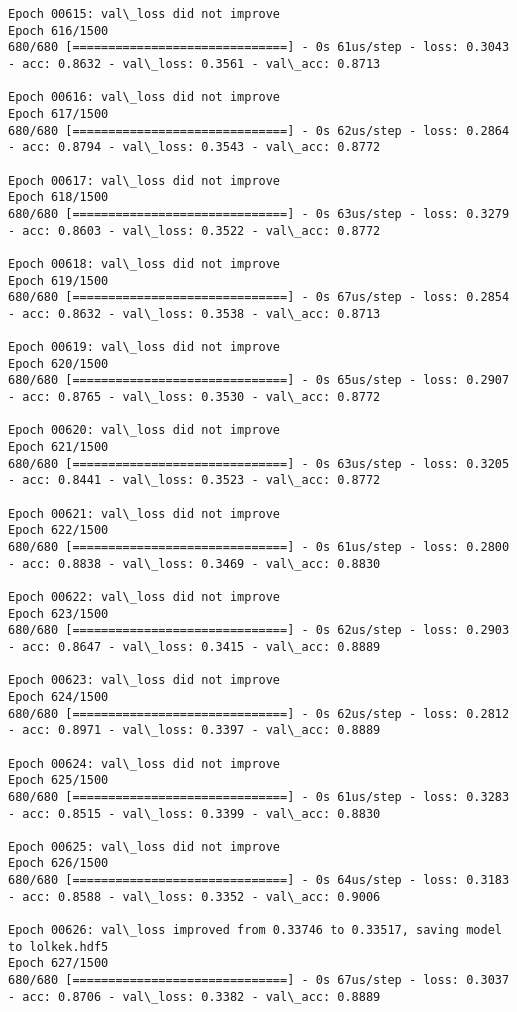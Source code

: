\documentclass[11pt]{article}
\begin{document}
\begin{Verbatim}[commandchars=\\\{\}]
Epoch 00615: val\_loss did not improve
Epoch 616/1500
680/680 [==============================] - 0s 61us/step - loss: 0.3043 - acc: 0.8632 - val\_loss: 0.3561 - val\_acc: 0.8713

Epoch 00616: val\_loss did not improve
Epoch 617/1500
680/680 [==============================] - 0s 62us/step - loss: 0.2864 - acc: 0.8794 - val\_loss: 0.3543 - val\_acc: 0.8772

Epoch 00617: val\_loss did not improve
Epoch 618/1500
680/680 [==============================] - 0s 63us/step - loss: 0.3279 - acc: 0.8603 - val\_loss: 0.3522 - val\_acc: 0.8772

Epoch 00618: val\_loss did not improve
Epoch 619/1500
680/680 [==============================] - 0s 67us/step - loss: 0.2854 - acc: 0.8632 - val\_loss: 0.3538 - val\_acc: 0.8713

Epoch 00619: val\_loss did not improve
Epoch 620/1500
680/680 [==============================] - 0s 65us/step - loss: 0.2907 - acc: 0.8765 - val\_loss: 0.3530 - val\_acc: 0.8772

Epoch 00620: val\_loss did not improve
Epoch 621/1500
680/680 [==============================] - 0s 63us/step - loss: 0.3205 - acc: 0.8441 - val\_loss: 0.3523 - val\_acc: 0.8772

Epoch 00621: val\_loss did not improve
Epoch 622/1500
680/680 [==============================] - 0s 61us/step - loss: 0.2800 - acc: 0.8838 - val\_loss: 0.3469 - val\_acc: 0.8830

Epoch 00622: val\_loss did not improve
Epoch 623/1500
680/680 [==============================] - 0s 62us/step - loss: 0.2903 - acc: 0.8647 - val\_loss: 0.3415 - val\_acc: 0.8889

Epoch 00623: val\_loss did not improve
Epoch 624/1500
680/680 [==============================] - 0s 62us/step - loss: 0.2812 - acc: 0.8971 - val\_loss: 0.3397 - val\_acc: 0.8889

Epoch 00624: val\_loss did not improve
Epoch 625/1500
680/680 [==============================] - 0s 61us/step - loss: 0.3283 - acc: 0.8515 - val\_loss: 0.3399 - val\_acc: 0.8830

Epoch 00625: val\_loss did not improve
Epoch 626/1500
680/680 [==============================] - 0s 64us/step - loss: 0.3183 - acc: 0.8588 - val\_loss: 0.3352 - val\_acc: 0.9006

Epoch 00626: val\_loss improved from 0.33746 to 0.33517, saving model to lolkek.hdf5
Epoch 627/1500
680/680 [==============================] - 0s 67us/step - loss: 0.3037 - acc: 0.8706 - val\_loss: 0.3382 - val\_acc: 0.8889


\end{Verbatim}
\end{document}
